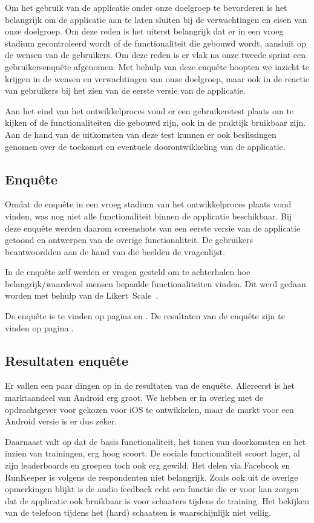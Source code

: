 Om het gebruik van de applicatie onder onze doelgroep te bevorderen is het belangrijk om de applicatie aan te laten sluiten bij de verwachtingen en eisen van onze doelgroep. Om deze reden is het uiterst belangrijk dat er in een vroeg stadium gecontroleerd wordt of de functionaliteit die gebouwd wordt, aansluit op de wensen van de gebruikers. Om deze reden is er vlak na onze tweede sprint een gebruikersenquête afgenomen. Met behulp van deze enquête hoopten we inzicht te krijgen in de wensen en verwachtingen van onze doelgroep, maar ook in de reactie van gebruikers bij het zien van de eerste versie van de applicatie.

Aan het eind van het ontwikkelproces vond er een gebruikerstest plaats om te kijken of de functionaliteiten die gebouwd zijn, ook in de praktijk bruikbaar zijn. Aan de hand van de uitkomsten van deze test kunnen er ook beslissingen genomen over de toekomst en eventuele doorontwikkeling van de applicatie.

\subsection{Enquête}
Omdat de enquête in een vroeg stadium van het ontwikkelproces plaats vond vinden, was nog niet alle functionaliteit binnen de applicatie beschikbaar. Bij deze enquête werden daarom screenshots van een eerste versie van de applicatie getoond en ontwerpen van de overige functionaliteit. De gebruikers beantwoordden aan de hand van die beelden de vragenlijst.

In de enquête zelf werden er vragen gesteld om te achterhalen hoe belangrijk/waardevol mensen bepaalde functionaliteiten vinden. Dit werd gedaan worden met behulp van de Likert~Scale~\cite{likert1932technique}.

De enquête is te vinden op pagina \pageref{fig:enquete1} en \pageref{fig:enquete2}. De resultaten van de enquête zijn te vinden op pagina \pageref{sec:enquete-resultaten}.

\subsection{Resultaten enquête}
Er vallen een paar dingen op in de resultaten van de enquête. Allereerst is het marktaandeel van Android erg groot. We hebben er in overleg met de opdrachtgever voor gekozen voor iOS te ontwikkelen, maar de markt voor een Android versie is er dus zeker. 

Daarnaast valt op dat de basis functionaliteit, het tonen van doorkomsten en het inzien van trainingen, erg hoog scoort. De sociale functionaliteit scoort lager, al zijn leaderboards en groepen toch ook erg gewild. Het delen via Facebook en RunKeeper is volgens de respondenten niet belangrijk. Zoals ook uit de overige opmerkingen blijkt is de audio feedback echt een functie die er voor kan zorgen dat de applicatie ook bruikbaar is voor schaaters tijdens de training. Het bekijken van de telefoon tijdens het (hard) schaatsen is waarschijnlijk niet veilig.

